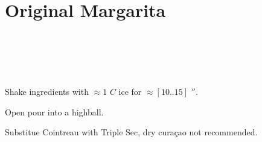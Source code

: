 \section[Original Margarita]{
    Original Margarita
}

\begin{recipestats}[
        servings=1,
        preptime=5 \minute,
        source=Mike \& Jane,
        original=\citefield{cointreauMargarita}{shorttitle}~\cite{cointreauMargarita},
    ]
\end{recipestats}

\begin{ingredientcolumns}
    \begin{ingredientblock}
        \\
        \\
    \end{ingredientblock}
    \begin{ingredientblock}
        \\
    \end{ingredientblock}
\end{ingredientcolumns}

\begin{preparation}
\item Shake ingredients with $\approx1$ $C$ ice for $\approx [10 .. 15]$ $\second$.
\item Open pour into a highball.
\end{preparation}

\begin{variation}
\item Substitue Cointreau with Triple Sec, dry cura\c{c}ao not recommended.
\end{variation}

\recipeend%
